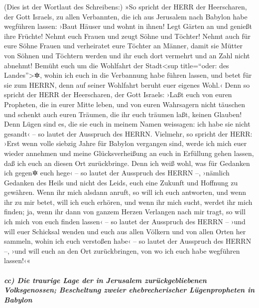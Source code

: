 (Dies ist der Wortlaut des Schreibens:) »So spricht der
HERR der Heerscharen, der Gott Israels, zu allen Verbannten, die ich aus
Jerusalem nach Babylon habe wegführen lassen: ›Baut Häuser
und wohnt in ihnen! Legt Gärten an und genießt ihre Früchte!
Nehmt euch Frauen und zeugt Söhne und Töchter! Nehmt auch
für eure Söhne Frauen und verheiratet eure Töchter an Männer, damit sie
Mütter von Söhnen und Töchtern werden und ihr euch dort vermehrt und an
Zahl nicht abnehmt! Bemüht euch um die Wohlfahrt der
Stadt\textless sup title=``oder: des Landes''\textgreater✲, wohin ich
euch in die Verbannung habe führen lassen, und betet für sie zum HERRN,
denn auf seiner Wohlfahrt beruht euer eigenes Wohl.‹ Denn
so spricht der HERR der Heerscharen, der Gott Israels: ›Laßt euch von
euren Propheten, die in eurer Mitte leben, und von euren Wahrsagern
nicht täuschen und schenkt auch euren Träumen, die ihr euch träumen
laßt, keinen Glauben! Denn Lügen sind es, die sie euch in
meinem Namen weissagen: ich habe sie nicht gesandt‹ -- so lautet der
Ausspruch des HERRN. Vielmehr, so spricht der HERR: ›Erst
wenn volle siebzig Jahre für Babylon vergangen sind, werde ich mich euer
wieder annehmen und meine Glücksverheißung an euch in Erfüllung gehen
lassen, daß ich euch an diesen Ort zurückbringe. Denn ich
weiß wohl, was für Gedanken ich gegen✲ euch hege‹ -- so lautet der
Ausspruch des HERRN --, ›nämlich Gedanken des Heils und nicht des Leids,
euch eine Zukunft und Hoffnung zu gewähren. Wenn ihr mich
alsdann anruft, so will ich euch antworten, und wenn ihr zu mir betet,
will ich euch erhören, und wenn ihr mich sucht, werdet
ihr mich finden; ja, wenn ihr dann von ganzem Herzen Verlangen nach mir
tragt, so will ich mich von euch finden lassen‹ -- so
lautet der Ausspruch des HERRN -- ›und will euer Schicksal wenden und
euch aus allen Völkern und von allen Orten her sammeln, wohin ich euch
verstoßen habe‹ -- so lautet der Ausspruch des HERRN --, ›und will euch
an den Ort zurückbringen, von wo ich euch habe wegführen lassen!‹«

\hypertarget{cc-die-traurige-lage-der-in-jerusalem-zuruxfcckgebliebenen-volksgenossen-bescheltung-zweier-ehebrecherischer-luxfcgenpropheten-in-babylon}{%
\subparagraph{cc) Die traurige Lage der in Jerusalem zurückgebliebenen
Volksgenossen; Bescheltung zweier ehebrecherischer Lügenpropheten in
Babylon}\label{cc-die-traurige-lage-der-in-jerusalem-zuruxfcckgebliebenen-volksgenossen-bescheltung-zweier-ehebrecherischer-luxfcgenpropheten-in-babylon}}

